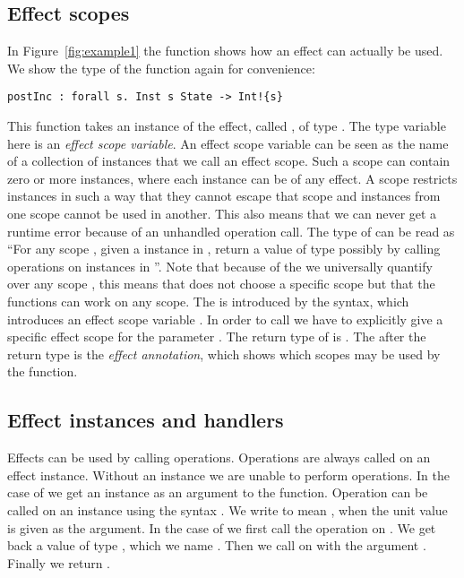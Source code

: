 \subsection{Effect scopes}
In Figure~\ref{fig:example1} the function  shows how an effect can actually be used.
We show the type of the function again for convenience:

\begin{verbatim}
postInc : forall s. Inst s State -> Int!{s}
\end{verbatim}

This function takes an instance of the  effect, called , of type .
The type variable  here is an \emph{effect scope variable}.
An effect scope variable can be seen as the name of a collection of instances that we call an effect scope.
Such a scope can contain zero or more instances, where each instance can be of any effect.
A scope restricts instances in such a way that they cannot escape that scope and instances from one scope cannot be used in another.
This also means that we can never get a runtime error because of an unhandled operation call.
The type of  can be read as ``For any scope , given a  instance in , return a value of type  possibly by calling operations on instances in ''.
Note that because of the  we universally quantify over any scope , this means that  does not choose a specific scope but that the functions can work on any scope.
The  is introduced by the \ident{[s]} syntax, which introduces an effect scope variable .
In order to call  we have to explicitly give a specific effect scope for the parameter .
The return type of  is .
The  after the return type is the \emph{effect annotation}, which shows which scopes may be used by the function.

\subsection{Effect instances and handlers}
\label{subsection:instances}
Effects can be used by calling operations.
Operations are always called on an effect instance.
Without an instance we are unable to perform operations.
In the case of  we get an instance as an argument to the function.
Operation can be called on an instance using the syntax .
We write  to mean , when the unit value \ident{()} is given as the argument.
In the case of  we first call the  operation on .
We get back a value of type , which we name .
Then we call  on  with the argument .
Finally we return .

